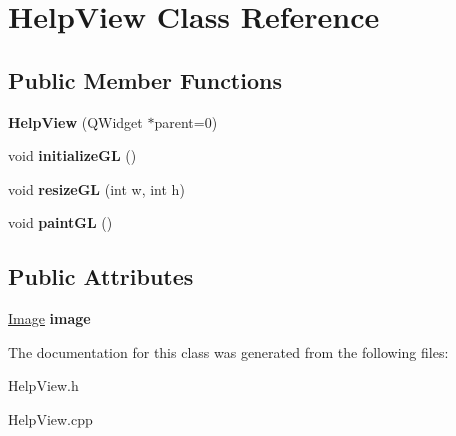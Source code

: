 \hypertarget{class_help_view}{\section{\-Help\-View \-Class \-Reference}
\label{class_help_view}
}
\subsection*{\-Public \-Member \-Functions}
\begin{DoxyCompactItemize}
\item 
\hypertarget{class_help_view_af5818649522a7ab3da2e122fc42b75d9}{{\bfseries \-Help\-View} (\-Q\-Widget $\ast$parent=0)}\label{class_help_view_af5818649522a7ab3da2e122fc42b75d9}

\item 
\hypertarget{class_help_view_a0f4cc7dc6856ed9bcdef5f1e9aad045a}{void {\bfseries initialize\-G\-L} ()}\label{class_help_view_a0f4cc7dc6856ed9bcdef5f1e9aad045a}

\item 
\hypertarget{class_help_view_a0519a15d2888e1033125be9df935a222}{void {\bfseries resize\-G\-L} (int w, int h)}\label{class_help_view_a0519a15d2888e1033125be9df935a222}

\item 
\hypertarget{class_help_view_a9fc12cd0260bc5eb94d2c9e156f523c9}{void {\bfseries paint\-G\-L} ()}\label{class_help_view_a9fc12cd0260bc5eb94d2c9e156f523c9}

\end{DoxyCompactItemize}
\subsection*{\-Public \-Attributes}
\begin{DoxyCompactItemize}
\item 
\hypertarget{class_help_view_a7a2f148e6a22a67529b829b796504fba}{\hyperlink{class_image}{\-Image} {\bfseries image}}\label{class_help_view_a7a2f148e6a22a67529b829b796504fba}

\end{DoxyCompactItemize}


\-The documentation for this class was generated from the following files\-:\begin{DoxyCompactItemize}
\item 
\-Help\-View.\-h\item 
\-Help\-View.\-cpp\end{DoxyCompactItemize}
